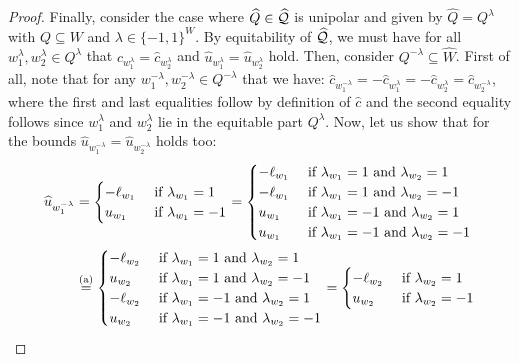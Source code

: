 \documentclass[pdflatex,sn-mathphys-num]{sn-jnl}%
\theoremstyle{thmstyleone}%
\theoremstyle{thmstylethree}%
\theoremstyle{thmstyletwo}%
\begin{document}
\begin{proof}
Finally, consider the case where $\widehat{Q}\in \widehat{\mathcal{Q}}$ is unipolar and given by $\widehat{Q} = Q^{\lambda}$ with $Q\subseteq W$ and $\lambda \in \{-1,1\}^W$. By equitability of $\widehat{\mathcal{Q}}$, we must have for all  $w_1^\lambda,w_2^\lambda \in Q^\lambda$ that $\widehat{c}_{w_1^\lambda} = \widehat{c}_{w_2^\lambda}$ and $\widehat{u}_{w_1^\lambda} = \widehat{u}_{w_2^\lambda}$ hold. Then, consider $Q^{-\lambda}\subseteq \widehat{W}$. First of all, note that for any $w_1^{-\lambda},w_2^{-\lambda} \in Q^{-\lambda}$ that we have: $\widehat{c}_{w_1^{-\lambda}} = -\widehat{c}_{w_1^{\lambda}} = -\widehat{c}_{w_2^{\lambda}} =\widehat{c}_{w_2^{-\lambda}}$, where the first and last equalities follow by definition of $\widehat{c}$ and the second equality follows since $w_1^\lambda$ and $w_2^\lambda$ lie in the equitable part $Q^\lambda$. Now, let us show that for the bounds $\widehat{u}_{w_1^{-\lambda}} = \widehat{u}_{w_2^{-\lambda}}$ holds too:
\begin{align*}
    \widehat{u}_{w_1^{-\lambda}} &= \begin{cases}
        -\ell_{w_1} &\text{ if $\lambda_{w_1} =1$}\\
        u_{w_1} &\text{ if $\lambda_{w_1} = -1$}
    \end{cases} = \begin{cases}
        -\ell_{w_1} &\text{ if $\lambda_{w_1} =1$ and $\lambda_{w_2} = 1$}\\
        -\ell_{w_1} &\text{ if $\lambda_{w_1} =1$ and $\lambda_{w_2} = -1$}\\
        u_{w_1} &\text{ if $\lambda_{w_1} = -1$ and $\lambda_{w_2} = 1$} \\
        u_{w_1} &\text{ if $\lambda_{w_1} = -1$ and $\lambda_{w_2} = -1$}
    \end{cases}\\
    &\stackrel{\textup{(a)}}{=} \begin{cases}
        -\ell_{w_2} &\text{ if $\lambda_{w_1} =1$ and $\lambda_{w_2} = 1$}\\
        u_{w_2} &\text{ if $\lambda_{w_1} =1$ and $\lambda_{w_2} = -1$}\\
        -\ell_{w_2} &\text{ if $\lambda_{w_1} = -1$ and $\lambda_{w_2} = 1$} \\
        u_{w_2} &\text{ if $\lambda_{w_1} = -1$ and $\lambda_{w_2} = -1$}
    \end{cases} =
    \begin{cases}
        -\ell_{w_2} &\text{ if $\lambda_{w_2} =1$}\\
        u_{w_2} &\text{ if $\lambda_{w_2} = -1$}

\end{cases}
\end{align*}
\end{proof}
\end{document}
